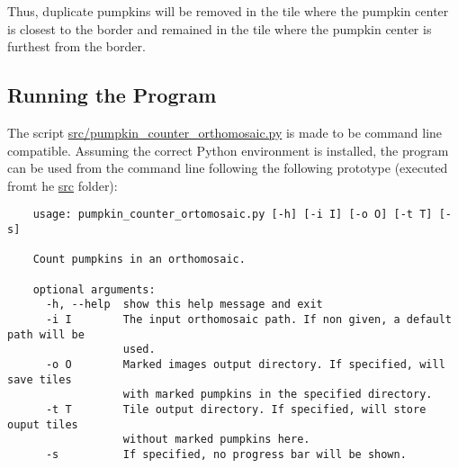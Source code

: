 \documentclass[../Head/Main.tex]{subfiles}
\begin{document}
Thus, duplicate pumpkins will be removed in the tile where the pumpkin center is closest to the border and remained in the tile where the pumpkin center is furthest from the border.

\subsection{Running the Program}
The script \url{src/pumpkin\_counter\_orthomosaic.py} is made to be command line compatible. Assuming the correct Python environment is installed, the program can be used from the command line following the following prototype (executed fromt he \url{src} folder):
\begin{verbatim}
    usage: pumpkin_counter_ortomosaic.py [-h] [-i I] [-o O] [-t T] [-s]

    Count pumpkins in an orthomosaic.

    optional arguments:
      -h, --help  show this help message and exit
      -i I        The input orthomosaic path. If non given, a default path will be
                  used.
      -o O        Marked images output directory. If specified, will save tiles
                  with marked pumpkins in the specified directory.
      -t T        Tile output directory. If specified, will store ouput tiles
                  without marked pumpkins here.
      -s          If specified, no progress bar will be shown.
\end{verbatim}
\end{document}
